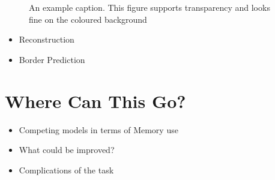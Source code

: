 \documentclass[
]{dtuposter}
\begin{document}
\begin{dtupostercontent}
\begin{figure}
	\centering
{}
\caption{An example caption. This figure supports transparency and looks fine on 
the coloured background}\label{fig:example}
\end{figure}

\begin{itemize}
	\item Reconstruction
	\item Border Prediction
\end{itemize}


\section{Where Can This Go?}
\begin{itemize}
	\item Competing models in terms of Memory use
	\item What could be improved?
	\item Complications of the task
\end{itemize}


\end{dtupostercontent}
\end{document}

